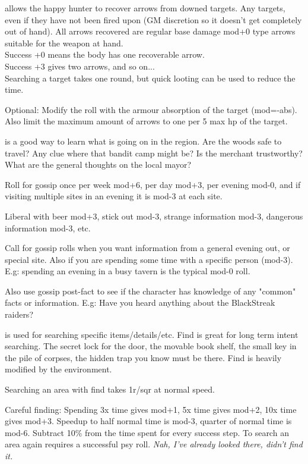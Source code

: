  allows the happy hunter to recover arrows from downed targets. Any targets, even if they have not been fired upon (GM discretion so it doesn't get completely out of hand). All arrows recovered are regular base damage mod+0 type arrows suitable for the weapon at hand.\\
Success +0 means the body has one recoverable arrow. \\
Success +3 gives two arrows, and so on...\\
Searching a target takes one round, but quick looting can be used to reduce the time.

Optional: Modify the roll with the armour absorption of the target (mod=-abs). Also limit the maximum amount of arrows to one per 5 max hp of the target.


 is a good way to learn what is going on in the region. Are the woods safe to travel? Any clue where that bandit camp might be? Is the merchant trustworthy? What are the general thoughts on the local mayor?

Roll for gossip once per week mod+6, per day mod+3, per evening mod-0, and if visiting multiple sites in an evening it is mod-3 at each site.

Liberal with beer mod+3, stick out mod-3, strange information mod-3, dangerous information mod-3, etc.

Call for gossip rolls when you want information from a general evening out, or special site. Also if you are spending some time with a specific person (mod-3). E.g: spending an evening in a busy tavern is the typical mod-0 roll.

Also use gossip post-fact to see if the character has knowledge of any "common" facts or information. E.g: Have you heard anything about the BlackStreak raiders?


 is used for searching specific items/details/etc. Find is great for long term intent searching. The secret lock for the door, the movable book shelf, the small key in the pile of corpses, the hidden trap you know must be there. Find is heavily modified by the environment.

Searching an area with find takes 1r/sqr at normal speed.

Careful finding: Spending 3x time gives mod+1, 5x time gives mod+2, 10x time gives mod+3. Speedup to half normal time is mod-3, quarter of normal time is mod-6. Subtract 10\% from the time spent for every success step. To search an area again requires a successful psy roll. \emph{Nah, I've already looked there, didn't find it.}

